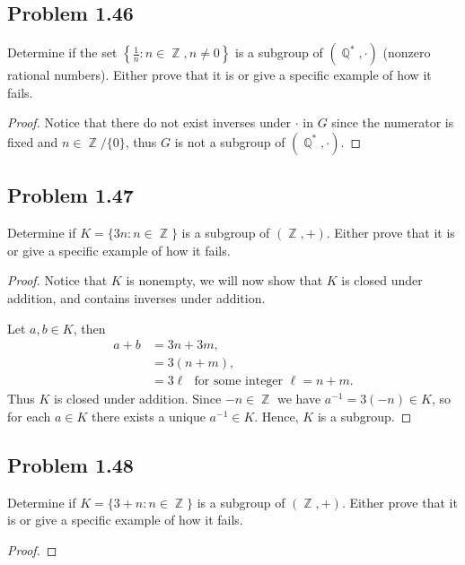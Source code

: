 \documentclass{amsbook}
\DeclareMathOperator{\Z}{\mathbb{Z}}
\DeclareMathOperator{\Q}{\mathbb{Q}}
\begin{document}
			\subsection*{Problem 1.46}
			\label{sub:problem_1_46}
			Determine if the set $\left\{ \frac{1}{n} : n \in \Z, n \neq 0 \right\}$ is a subgroup of $(\Q^{*},\cdot)$ (nonzero rational numbers). 
			Either prove that it is or give a specific example of how it fails.
			\begin{proof} Notice that there do not exist inverses under $\cdot$ in $G$ since the numerator is fixed and $n \in \Z/\{0\}$, thus $G$ is not a subgroup of $(\Q^{*},\cdot)$.
			\end{proof}

			\subsection*{Problem 1.47}
			\label{sub:problem_1_47}
			Determine if $K = \{ 3n : n \in \Z \}$ is a subgroup of $(\Z,+)$. 
			Either prove that it is or give a specific example of how it fails.
			\begin{proof} Notice that $K$ is nonempty, we will now show that $K$ is closed under addition, and contains inverses under addition.

			Let $a,b \in K$, then 
				\begin{align*}
					a+b &= 3n + 3m, \\
					&= 3(n + m), \\
					&= 3\ell \ \ \ \text{for some integer $\ell = n+m$.}
				\end{align*}
			Thus $K$ is closed under addition.
			Since $-n \in \Z$ we have $a^{-1} = 3(-n) \in K$, so for each $a \in K$ there exists a unique $a^{-1} \in K$.
			Hence, $K$ is a subgroup.	
			\end{proof}

			\subsection*{Problem 1.48}
			\label{sub:problem_1_48}
			Determine if $K = \{ 3 + n : n \in \Z \}$ is a subgroup of $(\Z, +)$.
			Either prove that it is or give a specific example of how it fails.
			\begin{proof}
			\end{proof}
\end{document}
